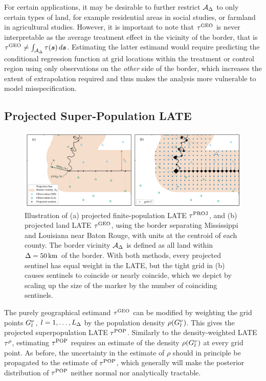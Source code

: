 	For certain applications, it may be desirable to further restrict \(\mathcal{A}_\Delta\) to only certain types of land, for example residential areas in social studies, or farmland in agricultural studies.
However, it is important to note that \(\tau^{\mathrm{GEO}}\) is never interpretable as the average treatment effect in the vicinity of the border, that is \(\tau^{\mathrm{GEO}} \neq \int_{\mathcal{A}_\Delta} \tau(\bm{s}) \mathop{d \bm{s}}\).
Estimating the latter estimand would require predicting the conditional regression function at grid locations within the treatment or control region using only observations on the \emph{other} side of the border, which increases the extent of extrapolation required and thus makes the analysis more vulnerable to model misspecification.

\subsection{Projected Super-Population LATE}

\begin{figure}[tb]
    \centering
    \includegraphics[width=\textwidth]{../figures/mississippi_projection_methods.png}
    \caption{
		\label{fig:mississippi_projection_methods}
        Illustration of (a) projected finite-population LATE \(\tau^{\mathrm{PROJ}}\), and (b) projected land LATE \(\tau^{\mathrm{GEO}}\), using the border separating Mississippi and Louisiana near Baton Rouge, with units at the centroid of each county.
        The border vicinity \(\mathcal{A}_\Delta\) is defined as all land within \(\Delta=50\,\mathrm{km}\) of the border.
    With both methods, every projected sentinel has equal weight in the LATE, but the tight grid in (b) causes sentinels to coincide or nearly coincide, which we depict by scaling up the size of the marker by the number of coinciding sentinels.}
\end{figure}

	The purely geographical estimand \(\tau^{\mathrm{GEO}}\) can be modified by weighting the grid points \(G^\nu_l\), \(l=1,\dotsc,L_\Delta\) by the population density \(\rho(G^\nu_l)\).
This gives the projected superpopulation LATE \(\tau^{\mathrm{POP}}\).
Similarly to the density-weighted LATE \(\tau^{\rho}\), estimating \(\tau^{\mathrm{POP}}\) requires an estimate of the density \(\rho(G^\nu_l)\) at every grid point.
As before, the uncertainty in the estimate of \(\rho\) should in principle be propagated to the estimate of \(\tau^{\mathrm{POP}}\), which generally will make the posterior distribution of \(\tau^{\mathrm{POP}}\) neither normal nor analytically tractable.

